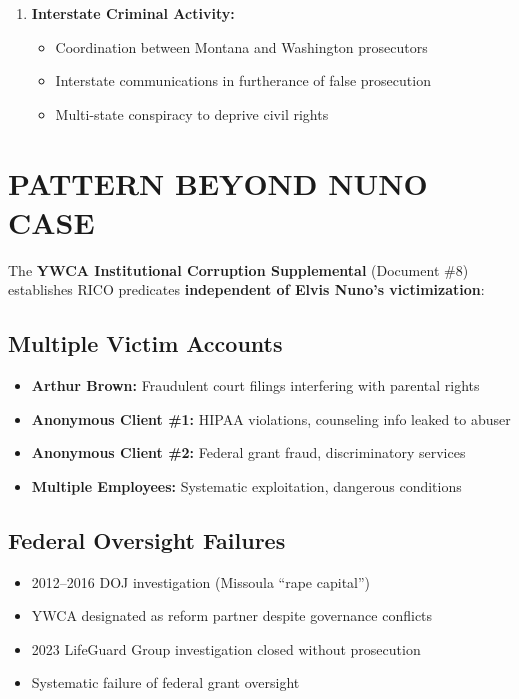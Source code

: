 \documentclass[12pt,oneside]{article}
\begin{document}
\begin{flushleft}
\begin{enumerate}
\item \textbf{Interstate Criminal Activity:}
\begin{itemize}
\item Coordination between Montana and Washington prosecutors
\item Interstate communications in furtherance of false prosecution
\item Multi-state conspiracy to deprive civil rights
\end{itemize}
\end{enumerate}

\section*{PATTERN BEYOND NUNO CASE}

The \textbf{YWCA Institutional Corruption Supplemental} (Document \#8) establishes RICO predicates \textbf{independent of Elvis Nuno's victimization}:

\subsection*{Multiple Victim Accounts}

\begin{itemize}
\item \textbf{Arthur Brown:} Fraudulent court filings interfering with parental rights
\item \textbf{Anonymous Client \#1:} HIPAA violations, counseling info leaked to abuser
\item \textbf{Anonymous Client \#2:} Federal grant fraud, discriminatory services
\item \textbf{Multiple Employees:} Systematic exploitation, dangerous conditions
\end{itemize}

\subsection*{Federal Oversight Failures}

\begin{itemize}
\item 2012--2016 DOJ investigation (Missoula ``rape capital'')
\item YWCA designated as reform partner despite governance conflicts
\item 2023 LifeGuard Group investigation closed without prosecution
\item Systematic failure of federal grant oversight
\end{itemize}


\end{flushleft}
\end{document}

